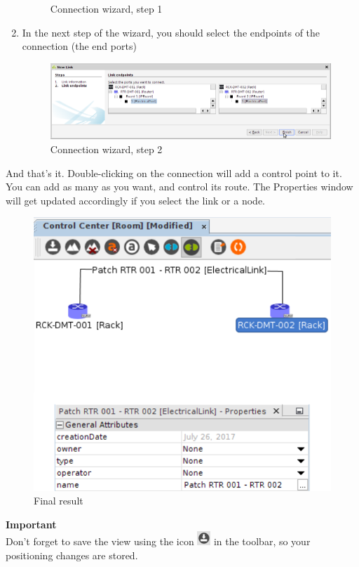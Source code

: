 \documentclass[a4paper]{article}
\begin{document}
\begin{enumerate}
\begin{figure}[h!]
					\caption{Connection wizard, step 1}
					\label{fig:l1_example_1_new_link_wizard}
				\end{figure}
								
				\item In the next step of the wizard, you should select the endpoints of the connection (the end ports)
				\begin{figure}[h!]
					\centering
					\includegraphics[width=0.8\linewidth]{img/l1_example_1_endpoints.png}
					\caption{Connection wizard, step 2}
					\label{fig:l1_example_1_endpoints}
				\end{figure}
			\end{enumerate}
			
			And that's it. Double-clicking on the connection will add a control point to it. You can add as many as you want, and control its route. The Properties window will get updated accordingly if you select the link or a node.
			\begin{figure}[h!]
				\centering
				\includegraphics[width=0.6\linewidth]{img/l1_example_1_final.png}
				\caption{Final result}
				\label{fig:l1_example_1_final}
			\end{figure}
			\begin{framed} {\large \textbf{Important}}\\
				Don't forget to save the view using the icon \includegraphics[width=0.5cm]{img/icon_save.png} in the toolbar, so your positioning changes are stored.
			\end{framed}
			\clearpage	
\end{document}
